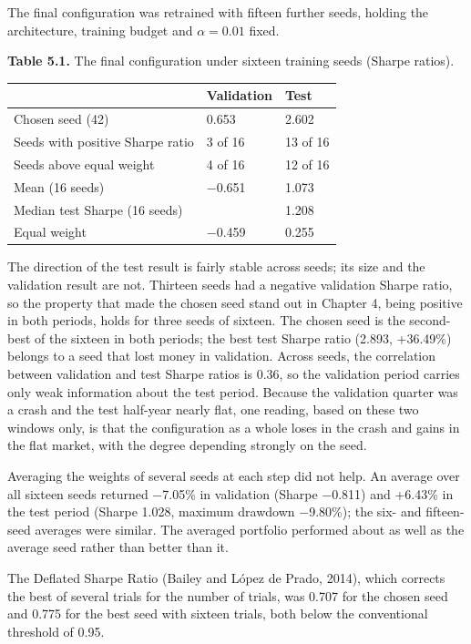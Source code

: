 \documentclass[12pt,a4paper]{report}
\begin{document}
The final configuration was retrained with fifteen further seeds,
holding the architecture, training budget and \(\alpha = 0.01\) fixed.

\textbf{Table 5.1.} The final configuration under sixteen training seeds
(Sharpe ratios).

{\small
\begin{longtable}[]{@{}lll@{}}
\toprule\noalign{}
& Validation & Test \\
\midrule\noalign{}
\endhead
\bottomrule\noalign{}
\endlastfoot
Chosen seed (42) & 0.653 & 2.602 \\
Seeds with positive Sharpe ratio & 3 of 16 & 13 of 16 \\
Seeds above equal weight & 4 of 16 & 12 of 16 \\
Mean (16 seeds) & −0.651 & 1.073 \\
Median test Sharpe (16 seeds) & & 1.208 \\
Equal weight & −0.459 & 0.255 \\
\end{longtable}
}

The direction of the test result is fairly stable across seeds; its size
and the validation result are not. Thirteen seeds had a negative
validation Sharpe ratio, so the property that made the chosen seed stand
out in Chapter 4, being positive in both periods, holds for three seeds
of sixteen. The chosen seed is the second-best of the sixteen in both
periods; the best test Sharpe ratio (2.893, +36.49\%) belongs to a seed
that lost money in validation. Across seeds, the correlation between
validation and test Sharpe ratios is 0.36, so the validation period
carries only weak information about the test period. Because the
validation quarter was a crash and the test half-year nearly flat, one
reading, based on these two windows only, is that the configuration as a
whole loses in the crash and gains in the flat market, with the degree
depending strongly on the seed.

Averaging the weights of several seeds at each step did not help. An
average over all sixteen seeds returned −7.05\% in validation (Sharpe
−0.811) and +6.43\% in the test period (Sharpe 1.028, maximum drawdown
−9.80\%); the six- and fifteen-seed averages were similar. The averaged
portfolio performed about as well as the average seed rather than better
than it.

The Deflated Sharpe Ratio (Bailey and López de Prado, 2014), which
corrects the best of several trials for the number of trials, was 0.707
for the chosen seed and 0.775 for the best seed with sixteen trials,
both below the conventional threshold of 0.95.
\end{document}
